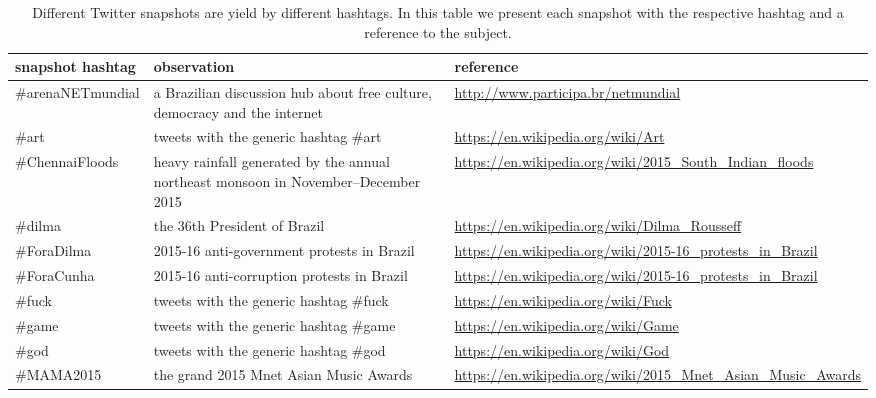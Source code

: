 \begin{apendicesenv}
																														      \begin{table*}[h!]\scriptsize
																															      \begin{center}
																																      \caption{Different Twitter snapshots are yield by different hashtags. In this
																																      table we present each snapshot with the respective hashtag and a
																																      reference to the subject.}\label{tab:provenance}
																																      \begin{tabular}{| l || p{4cm} | p{4cm} | }\hline
																																	      \textbf{snapshot hashtag} & \textbf{observation} & \textbf{reference} \\\hline\hline
																																		      \#arenaNETmundial & a Brazilian discussion hub about free culture, democracy and the internet & \url{http://www.participa.br/netmundial} \\\hline
																																			  \#art & tweets with the generic hashtag \#art & \url{https://en.wikipedia.org/wiki/Art} \\\hline
																																			      \#ChennaiFloods & heavy rainfall generated by the annual northeast monsoon in November–December 2015 & \url{https://en.wikipedia.org/wiki/2015_South_Indian_floods} \\\hline
																																				  \#dilma & the 36th President of Brazil & \url{https://en.wikipedia.org/wiki/Dilma_Rousseff} \\\hline
																																				      \#ForaDilma & 2015-16 anti-government protests in Brazil & \url{https://en.wikipedia.org/wiki/2015-16_protests_in_Brazil} \\\hline
																																					  \#ForaCunha & 2015-16 anti-corruption protests in Brazil & \url{https://en.wikipedia.org/wiki/2015-16_protests_in_Brazil} \\\hline
																																					      \#fuck & tweets with the generic hashtag \#fuck & \url{https://en.wikipedia.org/wiki/Fuck} \\\hline
																																						  \#game & tweets with the generic hashtag \#game & \url{https://en.wikipedia.org/wiki/Game} \\\hline
																																						      \#god & tweets with the generic hashtag \#god & \url{https://en.wikipedia.org/wiki/God} \\\hline
																																							  \#MAMA2015 & the grand 2015 Mnet Asian Music Awards & \url{https://en.wikipedia.org/wiki/2015_Mnet_Asian_Music_Awards} \\\hline

\end{tabular}
\end{center}
\end{table*}
\end{apendicesenv}
